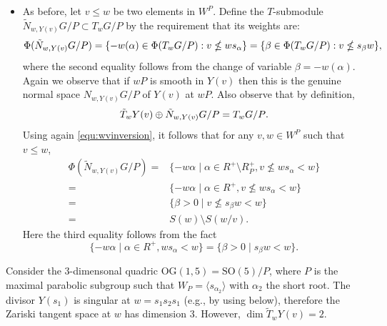 \begin{itemize}
	\item As before, let $v \le w$ be two elements in $W^P$. Define the $T$-submodule 
	$\tilde{N}_{w, Y(v)}G/P \subset T_w G/P$ by the requirement that its weights are:
	\[ \Phi(\tilde{N}_{w,Y(v)} G/P) = \{ -w(\alpha) \in \Phi(T_w G/P): v \nleq w s_\alpha \}=\{ \beta \in \Phi(T_w G/P): v \nleq s_\beta w  \} \/, \]
	where the second equality follows from the change of variable $\beta=-w(\alpha)$.
	Again we observe that if $wP$ is smooth in $Y(v)$ then this is the genuine normal
	space $N_{w, Y(v)}G/P$ of $Y(v)$ at $wP$. Also observe that by definition,
	\[ \tilde{T}_w Y(v) \oplus \tilde{N}_{w,Y(v)} G/P = T_w G/P \/. \]
	Using again \eqref{equ:wvinversion}, it follows that for any $v,w\in W^P$ such that $v\leq w$,
		\begin{align*}
			\Phi(\tilde{N}_{w,Y(v)} G/P)=&\{-w\alpha\mid \alpha\in R^+\setminus R^+_P, v\nleq ws_\alpha<w\}\\
			=&\{-w\alpha\mid \alpha\in R^+, v\nleq ws_\alpha<w\}\\
			=&\{\beta>0\mid v\nleq s_\beta w<w\}\\
			=&S(w)\setminus S(w/v).
		\end{align*}
		Here the third equality follows from the fact
		\[\{-w\alpha\mid \alpha\in R^+,  ws_\alpha<w\}=\{\beta>0\mid s_\beta w<w\}.\]
\end{itemize}
\begin{example}\label{ex:zariski} Consider the $3$-dimensonal quadric 
		$\mathrm{OG}(1,5)=\mathrm{SO}(5)/P$, where
		$P$ is the maximal parabolic subgroup 
		such that $W_{P}= \langle s_{\alpha_2} \rangle$ with $\alpha_2$ the short root.
		The divisor $Y(s_1)$ is singular at $w=s_1 s_2 s_1$ (e.g., by using
		 below), therefore the Zariski tangent
		space at $w$ has dimension $3$. However, $\dim \tilde{T}_w Y(v)=2$.
\end{example}

